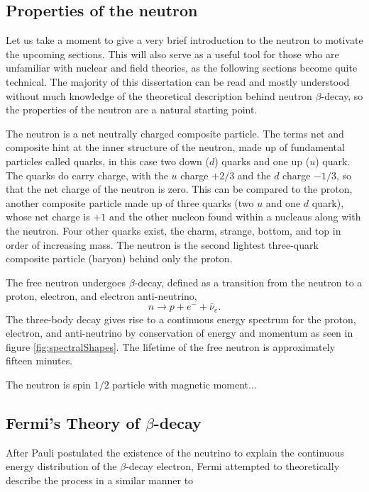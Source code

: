 \subsection{Properties of the neutron}
\label{ssec:neutronProperties}
Let us take a moment to give a very brief introduction to the neutron to motivate the
upcoming sections. This will also serve as a useful tool for those who are
unfamiliar with nuclear and field theories, as the following sections become
quite technical. The majority of this dissertation can be read and mostly understood
without much knowledge of the theoretical description behind neutron $\beta$-decay,
so the properties of the neutron are a natural starting point.

The neutron is a net neutrally charged composite particle. The terms net and
composite hint at the inner structure of the neutron, made up of fundamental
particles called quarks, in this case two down ($d$) quarks and one up ($u$) quark.
The quarks do carry charge, with the $u$ charge $+2/3$ and the $d$ charge
$-1/3$, so that the net charge of the neutron is zero. This can be compared
to the proton, another composite particle made up of three quarks (two $u$ and
one $d$ quark), whose net charge is $+1$ and the other nucleon found
within a nucleaus along with the neutron. Four other quarks exist,
the charm, strange, bottom, and top in order of increasing mass. The neutron
is the second lightest three-quark composite particle (baryon) 
behind only the proton.

The free neutron undergoes $\beta$-decay, defined as a transition from the neutron
to a proton, electron, and electron anti-neutrino,
\begin{equation*}
  n\rightarrow p + e^- + \bar{\nu}_{e}.
\end{equation*}
\noindent The three-body decay gives rise to a continuous energy spectrum
for the proton, electron, and anti-neutrino by conservation of energy and momentum
as seen in figure \ref{fig:spectralShapes}. The lifetime of the free neutron is
approximately fifteen minutes.

The neutron is spin $1/2$ particle with magnetic moment...

\subsection{Fermi's Theory of $\beta$-decay}
After Pauli postulated the existence of the neutrino to explain the continuous energy
distribution of the $\beta$-decay electron, Fermi attempted to theoretically describe
the process in a similar manner to

